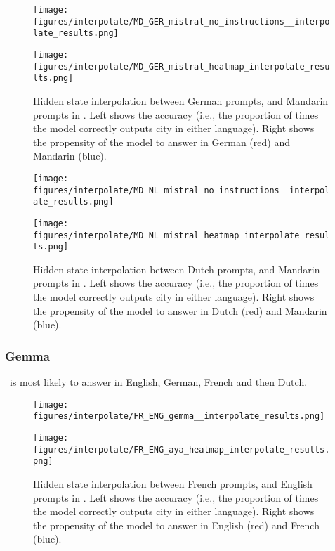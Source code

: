 \begin{figure}[h]
\begin{minipage}{0.49\textwidth}
    \centering
    \texttt{[image: figures/interpolate/MD\_GER\_mistral\_no\_instructions\_\_interpolate\_results.png]} 
\end{minipage}
\begin{minipage}{0.49\textwidth}
    \centering
    \texttt{[image: figures/interpolate/MD\_GER\_mistral\_heatmap\_interpolate\_results.png]} 
\end{minipage}
\caption{Hidden state interpolation between German prompts, and Mandarin prompts in \mistral. Left shows the accuracy (i.e., the proportion of times the model correctly outputs city in either language). Right shows the propensity of the model to answer in German (red) and Mandarin (blue). }
\end{figure}

\begin{figure}[h]
\begin{minipage}{0.49\textwidth}
    \centering
    \texttt{[image: figures/interpolate/MD\_NL\_mistral\_no\_instructions\_\_interpolate\_results.png]} 
\end{minipage}
\begin{minipage}{0.49\textwidth}
    \centering
    \texttt{[image: figures/interpolate/MD\_NL\_mistral\_heatmap\_interpolate\_results.png]} 
\end{minipage}
\caption{Hidden state interpolation between Dutch prompts, and Mandarin prompts in \mistral. Left shows the accuracy (i.e., the proportion of times the model correctly outputs city in either language). Right shows the propensity of the model to answer in Dutch (red) and Mandarin (blue). }
\end{figure}


\FloatBarrier
\newpage 
\subsubsection{Gemma} 

\gemma \ is most likely to answer in English, German, French and then Dutch. 


\begin{figure}[h]
\begin{minipage}{0.49\textwidth}
    \centering
    \texttt{[image: figures/interpolate/FR\_ENG\_gemma\_\_interpolate\_results.png]} 
\end{minipage}
\begin{minipage}{0.49\textwidth}
    \centering
    \texttt{[image: figures/interpolate/FR\_ENG\_aya\_heatmap\_interpolate\_results.png]} 
\end{minipage}
\caption{Hidden state interpolation between French prompts, and English prompts in \gemma. Left shows the accuracy (i.e., the proportion of times the model correctly outputs city in either language). Right shows the propensity of the model to answer in English (red) and French (blue). }
\end{figure}


